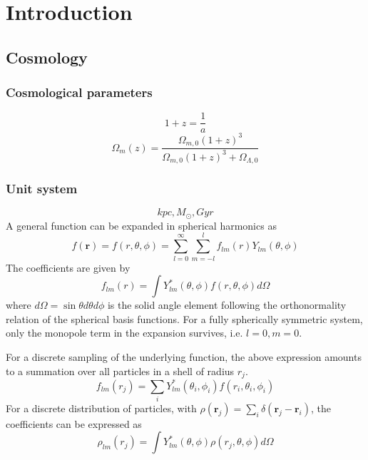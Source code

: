 \chapter{Introduction}
\section{Cosmology}
\subsection{Cosmological parameters}
\begin{equation}
1 + z = \frac{1}{a}
\end{equation}
\begin{equation}
\Omega_m (z) = \frac{\Omega_{m,0} (1+z)^3}{\Omega_{m,0} (1+z)^3 + \Omega_{\Lambda,0}}
\end{equation}

\subsection{Unit system}
\begin{equation}
    kpc, M_\odot, Gyr
\end{equation}
A general function can be expanded in spherical harmonics as
\begin{equation}
    f(\textbf{r}) = f(r, \theta, \phi) = \sum_{l=0}^{\infty} \sum_{m=-l}^{l} f_{lm}(r) Y_{lm}(\theta, \phi)
\end{equation}
The coefficients are given by
\begin{equation}
    f_{lm}(r) = \int Y_{lm}^*(\theta, \phi) f(r, \theta, \phi) d\Omega
\end{equation}
where $d\Omega = \sin{\theta} d\theta d\phi$ is the solid angle element following the orthonormality relation of the spherical basis functions. For a fully spherically symmetric system, only the monopole term in the expansion survives, i.e. \(l=0, m=0\).

For a discrete sampling of the underlying function, the above expression amounts to a summation over all particles in a shell of radius $r_j$.
\begin{equation}
    f_{lm}(r_j) = \sum_{i} Y_{lm}^*(\theta_i, \phi_i) f(r_i, \theta_i, \phi_i)
\end{equation}
For a discrete distribution of particles, with $\rho(\textbf{r}_j) = \sum_{i} \delta(\textbf{r}_j - \textbf{r}_i)$, the coefficients can be expressed as
\begin{equation}
    \rho_{lm}(r_j) = \int Y_{lm}^*(\theta, \phi) \rho(r_j, \theta, \phi) d\Omega
\end{equation}
